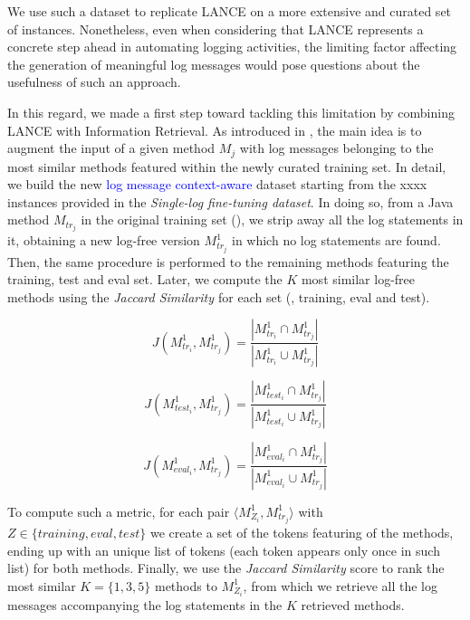 We use such a dataset to replicate LANCE on a more extensive and curated set of instances.
Nonetheless, even when considering that LANCE represents a concrete step ahead in automating logging activities, the limiting factor affecting the generation of meaningful log messages would pose questions about the usefulness of such an approach.  

In this regard, we made a first step toward tackling this limitation by combining LANCE with Information Retrieval.
As introduced in , the main idea is to augment the input of a given \java method $M_{j}$ with log messages belonging to the most similar methods featured within the newly curated training set. In detail, we build the new  \textcolor{blue}{log message context-aware} dataset starting from the xxxx instances provided in the \textit{Single-log fine-tuning dataset}. In doing so, from a Java method $M_{tr_j}$ in the original training set (), we strip away all the log statements in it, obtaining a new log-free version $M_{tr_j}^{1}$ in which no log statements are found. Then, the  same procedure is performed to the remaining methods featuring the training, test and eval set. Later, we compute the $K$ most similar log-free methods using the \textit{Jaccard Similarity \cite{hancock2004jaccard}} for each set (\ie, training, eval and test).

\begin{equation}
	J(M_{tr_i}^{1}, M_{tr_j}^{1})=\frac{|M_{tr_i}^{1}  \cap M_{tr_j}^{1} |}{|M_{tr_i}^{1}  \cup M_{tr_j}^{1} |}
\end{equation}

\begin{equation}
	J(M_{test_i}^{1}, M_{tr_j}^{1})=\frac{|M_{test_i}^{1}  \cap M_{tr_j}^{1} |}{| M_{test_i}^{1}  \cup M_{tr_j}^{1} |}
\end{equation}


\begin{equation}
	J(M_{eval_i}^{1}, M_{tr_j}^{1})=\frac{|M_{eval_i}^{1} \cap M_{tr_j}^{1} |}{| M_{eval_i}^{1} \cup M_{tr_j}^{1} |}
\end{equation}

To compute such a metric, for each pair $\langle M_{Z_i}^{1}, M_{tr_j}^{1} \rangle$ with $Z \in \{ training, eval, test\}$ we create a set of the \java tokens featuring of the methods, ending up with an unique list of \java tokens (\ie each token appears only once in such list) for both methods.
Finally, we use the \textit{Jaccard Similarity} score to rank the most similar $K=\{1,3,5\}$ methods to $M_{Z_i}^{1}$, from which we retrieve all the log messages accompanying the log statements in the $K$ retrieved methods.

